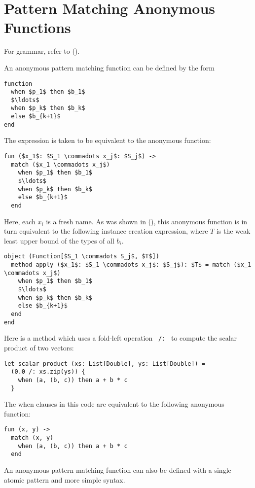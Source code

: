 \section{Pattern Matching Anonymous Functions}
\label{sec:pattern-matching-anon-fun}

For grammar, refer to ().

An anonymous pattern matching function can be defined by the form
\begin{lstlisting}
function 
  when $p_1$ then $b_1$ 
  $\ldots$ 
  when $p_k$ then $b_k$ 
  else $b_{k+1}$
end
\end{lstlisting}

The expression is taken to be equivalent to the anonymous function:
\begin{lstlisting}
fun ($x_1$: $S_1 \commadots x_j$: $S_j$) ->
  match ($x_1 \commadots x_j$)
    when $p_1$ then $b_1$
    $\ldots$
    when $p_k$ then $b_k$
    else $b_{k+1}$
  end
\end{lstlisting}

Here, each $x_i$ is a fresh name. As was shown in (), this anonymous function is in turn equivalent to the following instance creation expression, where $T$ is the weak least upper bound of the types of all $b_i$. 

\begin{lstlisting}
object (Function[$S_1 \commadots S_j$, $T$])
  method apply ($x_1$: $S_1 \commadots x_j$: $S_j$): $T$ = match ($x_1 \commadots x_j$)
    when $p_1$ then $b_1$
    $\ldots$
    when $p_k$ then $b_k$
    else $b_{k+1}$
  end
end
\end{lstlisting}

\example Here is a method which uses a fold-left operation ~\lstinline!/:!~ to compute the scalar product of two vectors:
\begin{lstlisting}
let scalar_product (xs: List[Double], ys: List[Double]) = 
  (0.0 /: xs.zip(ys)) {
    when (a, (b, c)) then a + b * c
  }
\end{lstlisting}
The when clauses in this code are equivalent to the following anonymous function:
\begin{lstlisting}
fun (x, y) -> 
  match (x, y)
    when (a, (b, c)) then a + b * c
  end
\end{lstlisting}

An anonymous pattern matching function can also be defined with a single atomic pattern and more simple syntax. 










